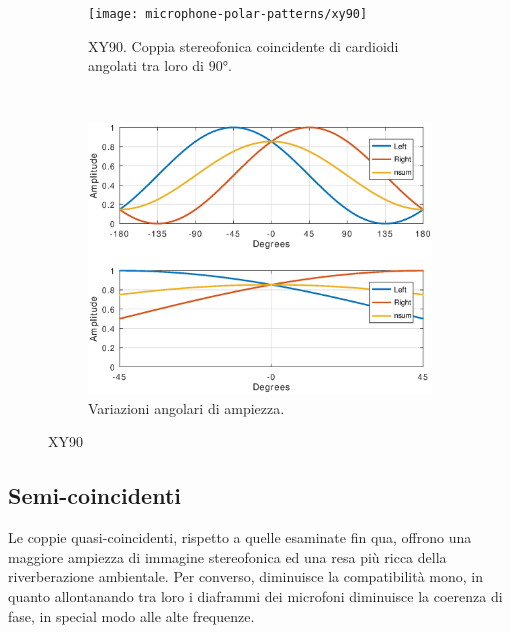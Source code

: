 \begin{figure}[t]
    \centering
    \begin{subfigure}[t]{0.99\textwidth}
        \centering
        \texttt{[image: microphone-polar-patterns/xy90]}
        \caption[]{XY90. Coppia stereofonica coincidente di cardioidi angolati tra loro di $90°$.}%
        \label{pol:xy90sp}
    \end{subfigure}%
    \\
    \begin{subfigure}[t]{0.99\textwidth}
        \centering
        \includegraphics[width=12.5cm]{CAPITOLI/0300/IMG/xy90sub}
        \caption[]{Variazioni angolari di ampiezza.}%
        \label{plot:xy90}
    \end{subfigure}
    \caption[]{XY90}
    \label{sp:xy90}
\end{figure}

\clearpage

\subsection{Semi-coincidenti}

Le coppie quasi-coincidenti, rispetto a quelle esaminate fin qua, offrono una
maggiore ampiezza di immagine stereofonica ed una resa più ricca della riverberazione
ambientale. Per converso, diminuisce la compatibilità mono, in quanto allontanando
tra loro i diaframmi dei microfoni diminuisce la coerenza di fase, in special
modo alle alte frequenze.

